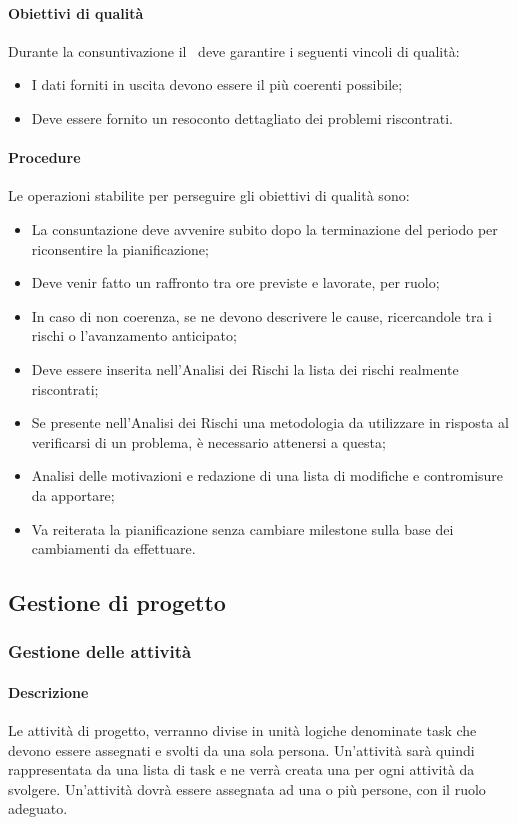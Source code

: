 \documentclass[../NormeDiProgetto_v4.0.0.tex]{subfiles}
\begin{document}
			\paragraph{Obiettivi di qualità}
				Durante la consuntivazione il \responsabilediprogetto\ deve garantire i seguenti vincoli di qualità: 
				\begin{itemize}
					\item I dati forniti in uscita devono essere il più coerenti possibile;
					\item Deve essere fornito un resoconto dettagliato dei problemi riscontrati.
				\end{itemize}
			\paragraph{Procedure}
				Le operazioni stabilite per perseguire gli obiettivi di qualità sono:
				\begin{itemize}
					\item La consuntazione deve avvenire subito dopo la terminazione del periodo per riconsentire la pianificazione;
					\item Deve venir fatto un raffronto tra ore previste e lavorate, per ruolo;
					\item In caso di non coerenza, se ne devono descrivere le cause, ricercandole tra i rischi o l'avanzamento anticipato;
					\item Deve essere inserita nell'Analisi dei Rischi la lista dei rischi realmente riscontrati;
					\item Se presente nell'Analisi dei Rischi una metodologia da utilizzare in risposta al verificarsi di un problema, è necessario attenersi a questa;
					\item Analisi delle motivazioni e redazione di una lista di modifiche e contromisure da apportare;
					\item Va reiterata la pianificazione senza cambiare milestone sulla base dei cambiamenti da effettuare.
				\end{itemize}


	\subsection{Gestione di progetto}

		\subsubsection{Gestione delle attività}
			\paragraph{Descrizione}
			Le attività di progetto, verranno divise in unità logiche denominate task che devono essere assegnati e svolti da una sola persona. 
			Un'attività sarà quindi rappresentata da una lista di task e ne verrà creata una per ogni attività da svolgere.
			Un'attività dovrà essere assegnata ad una o più persone, con il ruolo adeguato.
\end{document}
